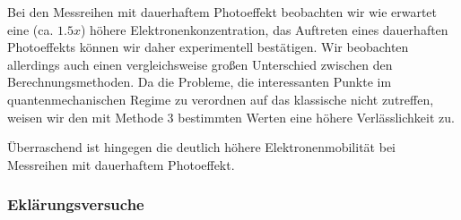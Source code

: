 \begin{table}[h!]
	\centering
	\caption{}
	
	\label{tab:Photo}
\end{table}
Bei den Messreihen mit dauerhaftem Photoeffekt beobachten wir wie erwartet eine (ca. $1.5x$) höhere Elektronenkonzentration, das Auftreten eines dauerhaften Photoeffekts können wir daher experimentell bestätigen. Wir beobachten allerdings auch einen vergleichsweise großen Unterschied zwischen den Berechnungsmethoden. Da die Probleme, die interessanten Punkte im quantenmechanischen Regime zu verordnen auf das klassische nicht zutreffen, weisen wir den mit Methode 3 bestimmten Werten eine höhere Verlässlichkeit zu. 

Überraschend ist hingegen die deutlich höhere Elektronenmobilität bei Messreihen mit dauerhaftem Photoeffekt. 

\subsubsection{Eklärungsversuche}



